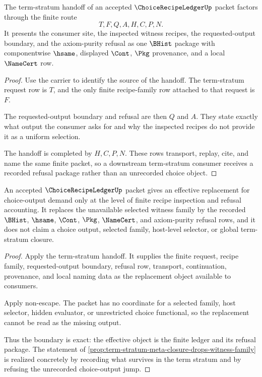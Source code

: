 \begin{theorem}
\label{thm:choice-recipe-ledger-term-stratum-handoff}
The term-stratum handoff of an accepted $\ChoiceRecipeLedgerUp$ packet factors through the finite route
$$
T,F,Q,A,H,C,P,N.
$$
It presents the consumer site, the inspected witness recipes, the requested-output boundary, and the axiom-purity refusal as one $\BHist$ package with componentwise $\hsame$, displayed $\Cont$, $\Pkg$ provenance, and a local $\NameCert$ row.
\end{theorem}
\begin{proof}
Use the carrier to identify the source of the handoff. The term-stratum request row is $T$, and the only finite recipe-family row attached to that request is $F$.

The requested-output boundary and refusal are then $Q$ and $A$. They state exactly what output the consumer asks for and why the inspected recipes do not provide it as a uniform selection.

The handoff is completed by $H,C,P,N$. These rows transport, replay, cite, and name the same finite packet, so a downstream term-stratum consumer receives a recorded refusal package rather than an unrecorded choice object.
\end{proof}

\begin{theorem}
\label{thm:choice-recipe-ledger-effective-replacement-boundary}
An accepted $\ChoiceRecipeLedgerUp$ packet gives an effective replacement for choice-output demand only at the level of finite recipe inspection and refusal accounting. It replaces the unavailable selected witness family by the recorded $\BHist$, $\hsame$, $\Cont$, $\Pkg$, $\NameCert$, and axiom-purity refusal rows, and it does not claim a choice output, selected family, host-level selector, or global term-stratum closure.
\end{theorem}
\begin{proof}
Apply the term-stratum handoff. It supplies the finite request, recipe family, requested-output boundary, refusal row, transport, continuation, provenance, and local naming data as the replacement object available to consumers.

Apply non-escape. The packet has no coordinate for a selected family, host selector, hidden evaluator, or unrestricted choice functional, so the replacement cannot be read as the missing output.

Thus the boundary is exact: the effective object is the finite ledger and its refusal package. The statement of \autoref{prop:term-stratum-meta-closure-drops-witness-family} is realized concretely by recording what survives in the term stratum and by refusing the unrecorded choice-output jump.
\end{proof}

